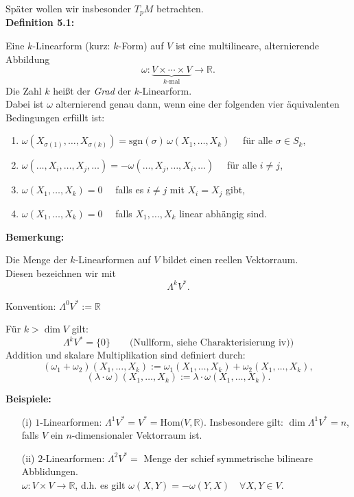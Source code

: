 \documentclass[fleqn, 12pt, letterpaper]{article}
\newcommand{\txt}[1]{\text{#1}}
\begin{document}
Später wollen wir insbesonder \( T_pM \) betrachten.\\

\textbf{Definition 5.1:} 

Eine \( k \)-Linearform (kurz: \( k \)-Form) auf \( V \) ist eine multilineare, alternierende Abbildung
\[
\omega \colon \underbrace{V \times \cdots \times V}_{k\text{-mal}} \longrightarrow \mathbb{R}.
\]
Die Zahl \( k \) heißt der \emph{Grad} der \( k \)-Linearform.\\

Dabei ist \( \omega \) alternierend genau dann, wenn eine der folgenden vier äquivalenten Bedingungen erfüllt ist:
\begin{enumerate}[label=\textit{\roman*)}]
    \item \( \omega(X_{\sigma(1)}, \dots, X_{\sigma(k)}) = \mathrm{sgn}(\sigma)\, \omega(X_1, \dots, X_k) \quad \) für alle \( \sigma \in S_k \),
    
    \item \( \omega(\dots, X_i, \dots, X_j, \dots) = -\omega(\dots, X_j, \dots, X_i, \dots) \quad \) für alle \( i \neq j \),
    
    \item \( \omega(X_1, \dots, X_k) = 0 \quad \) falls es \( i \neq j \) mit \( X_i = X_j \) gibt,
    
    \item \( \omega(X_1, \dots, X_k) = 0 \quad \) falls \( X_1, \dots, X_k \) linear abhängig sind.
\end{enumerate}

\textbf{Bemerkung:}

Die Menge der \( k \)-Linearformen auf \( V \) bildet einen reellen Vektorraum.\\
Diesen bezeichnen wir mit
\[
\Lambda^k V^*.
\]

Konvention: \quad \( \Lambda^0 V^* := \mathbb{R} \)

\medskip
Für \( k > \dim V \) gilt:
\[
\Lambda^k V^* = \{0\} \qquad \text{(Nullform, siehe Charakterisierung iv))}
\]
Addition und skalare Multiplikation sind definiert durch:
\[
(\omega_1 + \omega_2)(X_1, \dots, X_k) := \omega_1(X_1, \dots, X_k) + \omega_2(X_1, \dots, X_k),
\]
\[
(\lambda \cdot \omega)(X_1, \dots, X_k) := \lambda \cdot \omega(X_1, \dots, X_k).
\]

\textbf{Beispiele:}

\begin{itemize}
  \item[(i)] \( 1 \)-Linearformen: \( \Lambda^1 V^* = V^*=\txt{Hom}(V,\mathbb{R)} \). Insbesondere gilt: \( \dim \Lambda^1 V^* = n \), falls \( V \) ein \( n \)-dimensionaler Vektorraum ist.
  
  \item[(ii)] \( 2 \)-Linearformen: \( \Lambda^2 V^*= \) Menge der schief symmetrische bilineare Abblidungen.\\
 \( \omega \colon V \times V \to \mathbb{R} \), d.h. es gilt \( \omega(X, Y) = -\omega(Y, X) \quad \forall X, Y \in V \).
\end{itemize}
\end{document}
